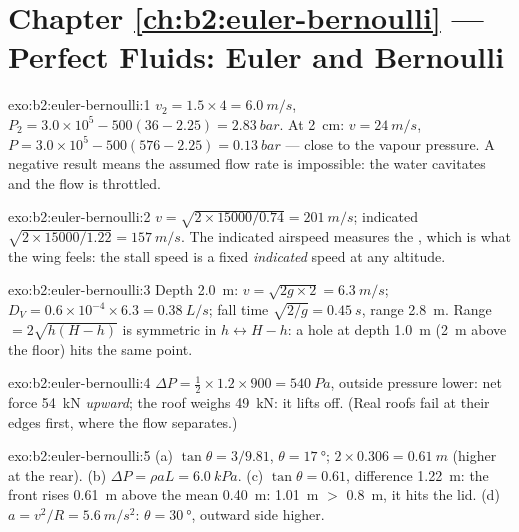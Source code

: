 \section*{Chapter \ref{ch:b2:euler-bernoulli} --- Perfect Fluids: Euler and Bernoulli}

\begin{solution}{exo:b2:euler-bernoulli:1}
$v_2 = 1.5 \times 4 = \qty{6.0}{m/s}$, $P_2 = 3.0 \times 10^5 - 500(36 - 2.25) =
\qty{2.83}{bar}$. At \qty{2}{cm}: $v = \qty{24}{m/s}$, $P = 3.0 \times 10^5 - 500
(576 - 2.25) = \qty{0.13}{bar}$ --- close to the vapour pressure. A negative
result means the assumed flow rate is impossible: the water cavitates
and the flow is throttled.
\end{solution}

\begin{solution}{exo:b2:euler-bernoulli:2}
$v = \sqrt{2 \times 15000/0.74} = \qty{201}{m/s}$; indicated $\sqrt{2 \times 15000/
1.22} = \qty{157}{m/s}$. The indicated airspeed measures the ,
which is what the wing feels: the stall speed is a fixed \emph{indicated}
speed at any altitude.
\end{solution}

\begin{solution}{exo:b2:euler-bernoulli:3}
Depth \qty{2.0}{m}: $v = \sqrt{2g \times 2} = \qty{6.3}{m/s}$; $D_V = 0.6 \times 10^{-4}
\times 6.3 = \qty{0.38}{L/s}$; fall time $\sqrt{2/g} = \qty{0.45}{s}$, range
\qty{2.8}{m}. Range $= 2\sqrt{h(H - h)}$ is symmetric in $h \leftrightarrow H -
h$: a hole at depth \qty{1.0}{m} (\qty{2}{m} above the floor) hits the same
point.
\end{solution}

\begin{solution}{exo:b2:euler-bernoulli:4}
$\Delta P = \tfrac12 \times 1.2 \times 900 = \qty{540}{Pa}$, outside pressure lower:
net force \qty{54}{kN} \emph{upward}; the roof weighs \qty{49}{kN}: it lifts
off. (Real roofs fail at their edges first, where the flow separates.)
\end{solution}

\begin{solution}{exo:b2:euler-bernoulli:5}
(a) $\tan\theta = 3/9.81$, $\theta = \qty{17}{\degree}$; $2 \times 0.306 = \qty{0.61}{m}$
(higher at the rear). (b) $\Delta P = \rho aL = \qty{6.0}{kPa}$. (c) $\tan\theta =
0.61$, difference \qty{1.22}{m}: the front rises \qty{0.61}{m} above the mean
\qty{0.40}{m}: \qty{1.01}{m} $>$ \qty{0.8}{m}, it hits the lid. (d) $a = v^2/R =
\qty{5.6}{m/s^2}$: $\theta = \qty{30}{\degree}$, outward side higher.
\end{solution}

